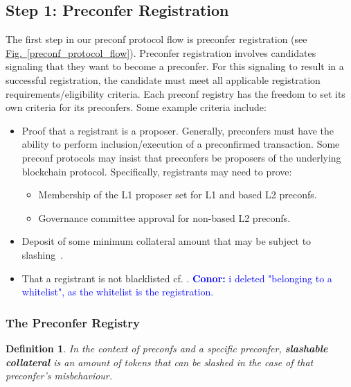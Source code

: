 \documentclass[a4paper]{article}
\theoremstyle{boldstyle}
\newtheorem{definitionx}{Definition}
\newenvironment{definition}
  {\begin{defopenboxq}\begin{definitionx}}
  {\end{definitionx}\end{defopenboxq}}
\newcommand{\cm}[1]{\textcolor{blue}{\textbf{Conor:} #1}}
\newcommand{\qb}[1]{\textcolor{red}{\textbf{Quentin:} #1}}
\newcommand{\ks}[1]{\textcolor{purple}{\textbf{Katerina:} #1}}
\begin{document}
\subsection{Step 1: Preconfer Registration} 


\label{step1:preconfer_registration}
    The first step in our preconf protocol flow is preconfer registration (see \hyperref[preconf_protocol_flow]{Fig.~\ref{preconf_protocol_flow}}). Preconfer registration involves candidates signaling that they want to become a preconfer. For this signaling to result in a successful registration, the candidate must meet all applicable registration requirements/eligibility criteria. %
    Each preconf registry has the freedom to set its own criteria for its preconfers. Some example criteria include:
    \begin{itemize}
        \item Proof that a registrant is a proposer. Generally, preconfers must have the ability to perform inclusion/execution of a preconfirmed transaction. Some preconf protocols may insist that preconfers be proposers of the underlying blockchain protocol. Specifically, registrants may need to prove:
        \begin{itemize}
            \item Membership of the L1 proposer set for L1 and based L2 preconfs.
            \item Governance committee approval for non-based L2 preconfs.
        \end{itemize}
        \item Deposit of some minimum collateral amount that may be subject to slashing~\cite{W:CrediblyNeutralPreconfirmationCollateral:ThePreconfirmationRegistry, W:PreconfirmationRegistry}.
        \item That a registrant is not blacklisted cf. \cite{W:PreconfirmationFairExchange}.
        \cm{i deleted "belonging to a whitelist", as the whitelist is the registration.}
        
    \end{itemize}

        \subsubsection{The Preconfer Registry} \label{preconfer_registry}
        \begin{definition}
            In the context of preconfs and a specific preconfer, \textbf{slashable collateral} is an amount of tokens that can be slashed in the case of that preconfer's misbehaviour. 
        \end{definition}
        
\end{document}
